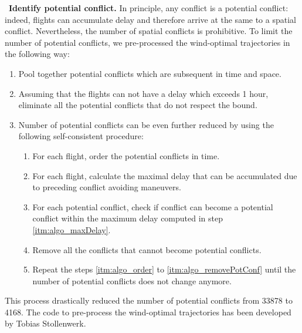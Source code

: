 \documentclass[9pt]{extarticle}
\begin{document}
\begin{changemargin}{0.5cm}{0cm}
\textbullet~\textbf{Identify potential conflict.} In principle, any conflict is a potential conflict: indeed, flights can accumulate delay
and therefore arrive at the same to a spatial conflict. Nevertheless, the number of spatial conflicts is prohibitive. To limit the number
of potential conflicts, we pre-processed the wind-optimal trajectories in the following way:
\begin{enumerate}
    \item Pool together potential conflicts which are subsequent in time and space.
    \item Assuming that the flights can not have a delay which exceeds 1 hour, eliminate all the potential conflicts that do not respect the bound.
    \item Number of potential conflicts can be even further reduced by using the following self-consistent procedure:
    \begin{enumerate}
        \item \label{itm:algo_order}For each flight, order the potential conflicts in time.
        \item \label{itm:algo_maxDelay}For each flight, calculate the maximal delay that can be accumulated due to preceding conflict avoiding maneuvers.
        \item \label{itm:algo_potConf}For each potential conflict, check if conflict can become a potential conflict within the maximum
       		delay computed in step \ref{itm:algo_maxDelay}.
        \item \label{itm:algo_removePotConf}Remove all the conflicts that cannot become potential conflicts.
        \item Repeat the steps \ref{itm:algo_order} to \ref{itm:algo_removePotConf} until the number of potential conflicts does not change anymore.
    \end{enumerate}
\end{enumerate}
\end{changemargin}
This process drastically reduced the number of potential conflicts from
33878 to 4168.
The code to pre-process the wind-optimal trajectories has
been developed by Tobias Stollenwerk.
\end{document}
